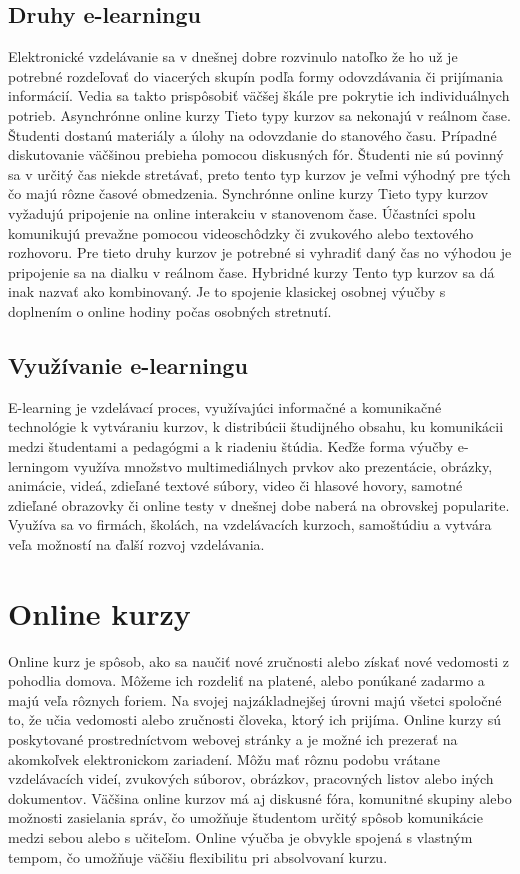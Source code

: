 \documentclass[10pt,twoside,slovak,a4paper]{article}
\begin{document}
\subsection{Druhy e-learningu} \label{druhy}

Elektronické vzdelávanie sa v dnešnej dobre rozvinulo natoľko že ho už je potrebné rozdeľovať do viacerých skupín podľa formy odovzdávania či prijímania informácií. Vedia sa takto prispôsobiť väčšej škále pre pokrytie ich individuálnych potrieb. 
Asynchrónne online kurzy
Tieto typy kurzov sa nekonajú v reálnom čase. Študenti dostanú materiály a úlohy na odovzdanie do stanového času. Prípadné diskutovanie väčšinou prebieha pomocou diskusných fór. Študenti nie sú povinný sa v určitý čas niekde stretávať, preto tento typ kurzov je veľmi výhodný pre tých čo majú rôzne časové obmedzenia.
Synchrónne online kurzy
Tieto typy kurzov vyžadujú pripojenie na online interakciu v stanovenom čase. Účastníci spolu komunikujú prevažne pomocou videoschôdzky či zvukového alebo textového rozhovoru. Pre tieto druhy kurzov je potrebné si vyhradiť daný čas no výhodou je pripojenie sa na dialku v reálnom čase.
Hybridné kurzy
Tento typ kurzov sa dá inak nazvať ako kombinovaný. Je to spojenie klasickej osobnej výučby s doplnením o online hodiny počas osobných stretnutí. 

\subsection{Využívanie e-learningu} \label{vyuzitie}

E-learning je vzdelávací proces, využívajúci informačné a komunikačné technológie k vytváraniu kurzov, k distribúcii študijného obsahu, ku komunikácii medzi študentami a pedagógmi a k riadeniu štúdia.
Keďže forma výučby e-lerningom využíva množstvo multimediálnych prvkov ako prezentácie, obrázky, animácie, videá, zdieľané textové súbory, video či hlasové hovory, samotné zdieľané obrazovky či online testy v dnešnej dobe naberá na obrovskej popularite. Využíva sa vo firmách, školách, na vzdelávacích kurzoch, samoštúdiu a vytvára veľa možností na ďalší rozvoj vzdelávania. 

\section{Online kurzy} \label{kurzy}

Online kurz je spôsob, ako sa naučiť nové zručnosti alebo získať nové vedomosti z pohodlia domova. Môžeme ich rozdeliť na platené, alebo ponúkané zadarmo a majú veľa rôznych foriem. Na svojej najzákladnejšej úrovni majú všetci spoločné to, že učia vedomosti alebo zručnosti človeka, ktorý ich prijíma. Online kurzy sú poskytované prostredníctvom webovej stránky a je možné ich prezerať na akomkoľvek elektronickom zariadení. Môžu mať rôznu podobu vrátane vzdelávacích videí, zvukových súborov, obrázkov, pracovných listov alebo iných dokumentov. Väčšina online kurzov má aj diskusné fóra, komunitné skupiny alebo možnosti zasielania správ, čo umožňuje študentom určitý spôsob komunikácie medzi sebou alebo s učiteľom. Online výučba je obvykle spojená s vlastným tempom, čo umožňuje väčšiu flexibilitu pri absolvovaní kurzu.
\end{document}
